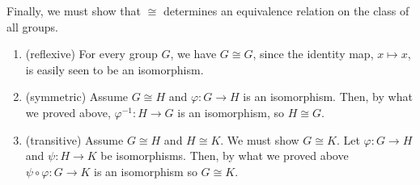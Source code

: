 \documentclass[12pt,reqno]{amsart}
\newcommand{\<}{\ensuremath{\langle}}
\renewcommand{\>}{\ensuremath{\rangle}}
\begin{document}
\begin{enumerate}[{\bf 1.}]
\medskip
Finally, we must show that $\cong$ determines an equivalence relation on the
class of all groups.
\begin{enumerate}
\item (reflexive) For every group $G$, we have $G \cong G$, since the identity
  map, $x \mapsto x$, is easily seen to be an isomorphism.
\item (symmetric) Assume $G \cong H$ and $\varphi: G \rightarrow H$ is an
  isomorphism. Then, by what we proved above, $\varphi^{-1}: H \rightarrow G$ is an isomorphism, so $H\cong G$.
\item (transitive) Assume $G \cong H$ and $H \cong K$.  We must show $G \cong K$. Let 
  $\varphi: G \rightarrow H$ and $\psi: H \rightarrow K$ be isomorphisms. Then, by what we proved above
 $\psi \circ \varphi: G \rightarrow K$ is an isomorphism so $G\cong K$.
\end{enumerate}
\end{enumerate}
\end{document}
